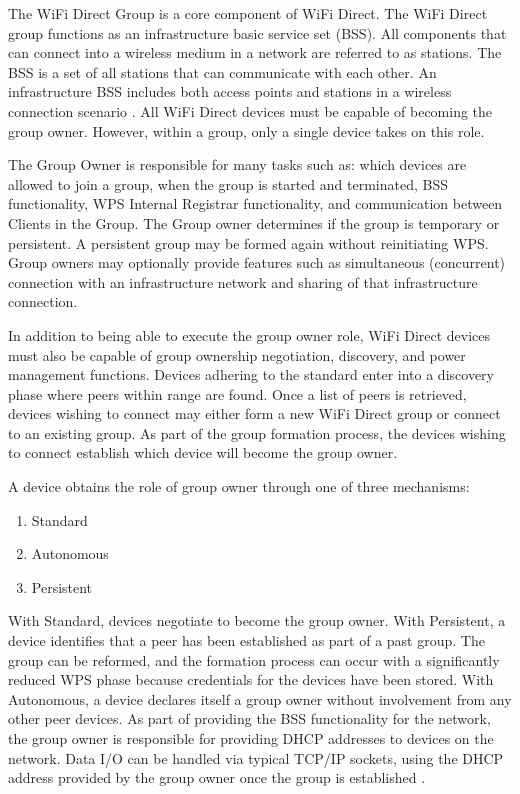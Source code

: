 \documentclass[10pt,twocolumn]{article}
\begin{document}
The WiFi Direct Group is a core component of WiFi Direct. 
The WiFi Direct group functions as an infrastructure basic service set (BSS). 
All components that can connect into a wireless medium in a network are referred to as stations. 
The BSS is a set of all stations that can communicate with each other. 
An infrastructure BSS includes both access points and stations in a wireless connection scenario \cite{wirelesslanwiki}.
All WiFi Direct devices must be capable of becoming the group owner. 
However, within a group, only a single device takes on this role.
 
The Group Owner is responsible for many tasks such as: which devices are allowed to join a group, when the group is started and terminated, BSS functionality, WPS Internal Registrar functionality, and communication between Clients in the Group. 
The Group owner determines if the group is temporary or persistent. 
A persistent group may be formed again without reinitiating WPS.
Group owners may optionally provide features such as simultaneous (concurrent) connection with an infrastructure network and sharing of that infrastructure connection. 

In addition to being able to execute the group owner role, WiFi Direct devices must also be capable of group ownership negotiation, discovery, and power management functions.
Devices adhering to the standard enter into a discovery phase where peers within range are found. 
Once a list of peers is retrieved, devices wishing to connect may either form a new  WiFi Direct group or connect to an existing group. 
As part of the group formation process, the devices wishing to connect establish which device will become the group owner.

A device obtains the role of group owner through one of three mechanisms: 
\begin{enumerate}
\item Standard
\item Autonomous
\item Persistent
\end{enumerate} 
With Standard, devices negotiate to become the group owner.
With Persistent, a device identifies that a peer has been established as part of a past group. 
The group can be reformed, and the formation process can occur with a significantly reduced WPS phase because credentials for the devices have been stored.
With Autonomous, a device declares itself a group owner without involvement from any other peer devices. 
As part of providing the BSS functionality for the network, the group owner is responsible for providing DHCP addresses to devices on the network.
Data I/O can be handled via typical TCP/IP sockets, using the DHCP address provided by the group owner once the group is established \cite{wifiwhitepaper}.
\end{document}
